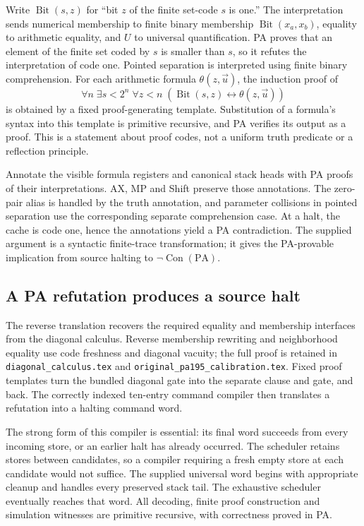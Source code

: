 \documentclass[11pt,letterpaper]{article}
\newcommand{\PA}{\mathrm{PA}}
\newcommand{\Con}{\operatorname{Con}}
\newcommand{\file}[1]{\texttt{\nolinkurl{#1}}}
\begin{document}
Write \(\operatorname{Bit}(s,z)\) for ``bit \(z\) of the finite set-code
\(s\) is one.'' The interpretation sends numerical membership to finite binary
membership \(\operatorname{Bit}(x_a,x_b)\), equality to arithmetic
equality, and \(U\) to universal quantification. PA proves that an
element of the finite set coded by \(s\) is smaller than \(s\), so it
refutes the interpretation of code one. Pointed separation is interpreted
using finite binary comprehension. For each arithmetic formula
\(\theta(z,\vec u)\), the induction proof of
\[
 \forall n\;\exists s<2^n\;\forall z<n\;
  (\operatorname{Bit}(s,z)\leftrightarrow\theta(z,\vec u))
\]
is obtained by a fixed proof-generating template. Substitution of a
formula's syntax into this template is primitive recursive, and PA
verifies its output as a proof. This is a statement about proof codes,
not a uniform truth predicate or a reflection principle.

Annotate the visible formula registers and canonical stack heads with
PA proofs of their interpretations. AX, MP and Shift preserve those
annotations. The zero-pair alias is handled by the truth annotation,
and parameter collisions in pointed separation use the corresponding
separate comprehension case. At a halt, the cache is code one, hence
the annotations yield a PA contradiction. The supplied argument is a
syntactic finite-trace transformation; it gives the PA-provable
implication from source halting to \(\neg\Con(\PA)\).

\subsection{A PA refutation produces a source halt}

The reverse translation recovers the required equality and membership
interfaces from the diagonal calculus. Reverse membership rewriting and
neighborhood equality use code freshness and diagonal vacuity;
the full proof is retained in \file{diagonal_calculus.tex} and
\file{original_pa195_calibration.tex}. Fixed proof templates turn the
bundled diagonal gate into the separate clause and gate, and back.
The correctly indexed ten-entry command compiler then translates a
refutation into a halting command word.

The strong form of this compiler is essential: its final word succeeds
from every incoming store, or an earlier halt has already occurred.
The scheduler retains stores between candidates, so a compiler requiring
a fresh empty store at each candidate would not suffice. The supplied
universal word begins with appropriate cleanup and handles every
preserved stack tail. The exhaustive scheduler eventually reaches that
word. All decoding, finite proof construction and simulation witnesses
are primitive recursive, with correctness proved in PA.
\end{document}

